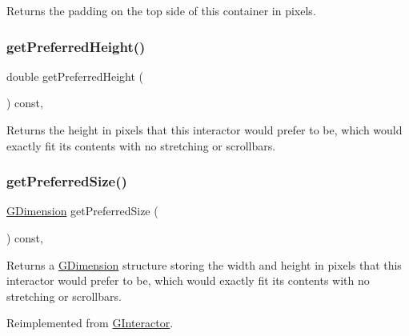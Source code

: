 Returns the padding on the top side of this container in pixels. 

\mbox{\label{classsgl_1_1GInteractor_a747de0961653847bdc6615dbf756d715}} 
\subsubsection{\texorpdfstring{get\+Preferred\+Height()}{getPreferredHeight()}}
{\footnotesize\ttfamily double get\+Preferred\+Height (\begin{DoxyParamCaption}{ }\end{DoxyParamCaption}) const\hspace{0.3cm}{\ttfamily [virtual]}, {\ttfamily [inherited]}}



Returns the height in pixels that this interactor would prefer to be, which would exactly fit its contents with no stretching or scrollbars. 

\mbox{\label{classsgl_1_1GContainer_ac0fd6fc35681f935c67ad68078b354b8}} 
\subsubsection{\texorpdfstring{get\+Preferred\+Size()}{getPreferredSize()}}
{\footnotesize\ttfamily \mbox{\hyperlink{structsgl_1_1GDimension}{G\+Dimension}} get\+Preferred\+Size (\begin{DoxyParamCaption}{ }\end{DoxyParamCaption}) const\hspace{0.3cm}{\ttfamily [override]}, {\ttfamily [virtual]}}



Returns a \mbox{\hyperlink{structsgl_1_1GDimension}{G\+Dimension}} structure storing the width and height in pixels that this interactor would prefer to be, which would exactly fit its contents with no stretching or scrollbars. 



Reimplemented from \mbox{\hyperlink{classsgl_1_1GInteractor_a4aabbee761d8e9116275401131b7ccd1}{G\+Interactor}}.

